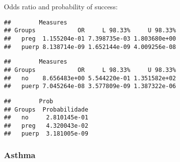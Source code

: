 \documentclass[
]{article}
\newenvironment{Shaded}{\begin{snugshade}}{\end{snugshade}}
\newcommand{\CommentTok}[1]{\textcolor[rgb]{0.56,0.35,0.01}{\textit{#1}}}
\newcommand{\KeywordTok}[1]{\textcolor[rgb]{0.13,0.29,0.53}{\textbf{#1}}}
\newcommand{\NormalTok}[1]{#1}
\newcommand{\OperatorTok}[1]{\textcolor[rgb]{0.81,0.36,0.00}{\textbf{#1}}}
\newcommand{\StringTok}[1]{\textcolor[rgb]{0.31,0.60,0.02}{#1}}
\begin{document}
Odds ratio and probability of success:

\begin{Shaded}
\end{Shaded}

\begin{verbatim}
##        Measures
## Groups            OR     L 98.33%     U 98.33%
##   preg  1.155204e-01 7.398735e-03 1.803680e+00
##   puerp 8.138714e-09 1.652144e-09 4.009256e-08
\end{verbatim}

\begin{Shaded}
\end{Shaded}

\begin{verbatim}
##        Measures
## Groups            OR     L 98.33%     U 98.33%
##   no    8.656483e+00 5.544220e-01 1.351582e+02
##   puerp 7.045264e-08 3.577809e-09 1.387322e-06
\end{verbatim}

\begin{Shaded}
\end{Shaded}

\begin{verbatim}
##        Prob
## Groups  Probabilidade
##   no     2.810145e-01
##   preg   4.320043e-02
##   puerp  3.181005e-09
\end{verbatim}

\hypertarget{asthma-1}{%
\subsubsection{Asthma}\label{asthma-1}}

\begin{Shaded}
\end{Shaded}
\end{document}
